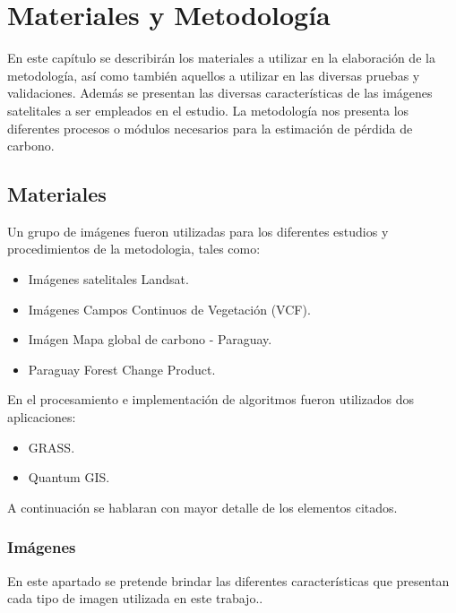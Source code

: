 \newpage{\ } 
\thispagestyle{empty} 

\chapter{Materiales y Metodolog\'ia}
En este cap\'itulo se describir\'an los materiales a utilizar en la elaboraci\'on de la metodolog\'ia, as\'i como tambi\'en aquellos a utilizar en las diversas pruebas y validaciones. Adem\'as se presentan las diversas características de las imágenes satelitales a ser empleados en el estudio. La metodolog\'ia nos presenta los diferentes procesos o m\'odulos necesarios para la estimaci\'on de p\'erdida de carbono.
\section{Materiales}
Un grupo de im\'agenes fueron utilizadas para los diferentes estudios y procedimientos de la metodologia, tales como:
\begin{itemize}
	\item Im\'agenes satelitales Landsat.
	\item Im\'agenes Campos Continuos de Vegetación (VCF).
	\item Im\'agen Mapa global de carbono - Paraguay.
	\item Paraguay Forest Change Product.
\end{itemize}
En el procesamiento e implementaci\'on de algoritmos fueron utilizados dos aplicaciones:
\begin{itemize}
	\item GRASS.
	\item Quantum GIS.
\end{itemize}
A continuaci\'on se hablaran con mayor detalle de los elementos citados.
\subsection{Im\'agenes}
En este apartado se pretende brindar las diferentes caracter\'isticas que presentan cada tipo de imagen utilizada en este trabajo..
